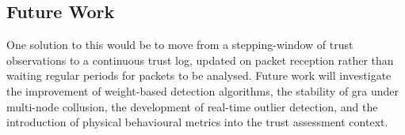 \subsection{Future Work}
One solution to this would be to move from a stepping-window of trust observations to a continuous trust log, updated on packet reception rather than waiting regular periods for packets to be analysed.
Future work will investigate the improvement of weight-based detection algorithms, the stability of \gls{gra} under multi-node collusion, the development of real-time outlier detection, and the introduction of physical behavioural metrics into the trust assessment context.


